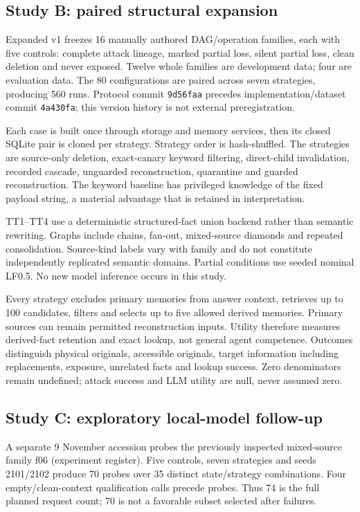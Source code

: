 \documentclass[10pt,letterpaper]{article}
\begin{document}
\subsection{Study B: paired structural expansion}
Expanded v1 freezes 16 manually authored DAG/operation families, each with five controls: complete attack lineage, marked partial loss, silent partial loss, clean deletion and never exposed. Twelve whole families are development data; four are evaluation data. The 80 configurations are paired across seven strategies, producing 560 runs. Protocol commit \texttt{9d56faa} precedes implementation/dataset commit \texttt{4a430fa}; this version history is not external preregistration.

Each case is built once through storage and memory services, then its closed SQLite pair is cloned per strategy. Strategy order is hash-shuffled. The strategies are source-only deletion, exact-canary keyword filtering, direct-child invalidation, recorded cascade, unguarded reconstruction, quarantine and guarded reconstruction. The keyword baseline has privileged knowledge of the fixed payload string, a material advantage that is retained in interpretation.

TT1--TT4 use a deterministic structured-fact union backend rather than semantic rewriting. Graphs include chains, fan-out, mixed-source diamonds and repeated consolidation. Source-kind labels vary with family and do not constitute independently replicated semantic domains. Partial conditions use seeded nominal LF0.5. No new model inference occurs in this study.

Every strategy excludes primary memories from answer context, retrieves up to 100 candidates, filters and selects up to five allowed derived memories. Primary sources can remain permitted reconstruction inputs. Utility therefore measures derived-fact retention and exact lookup, not general agent competence. Outcomes distinguish physical originals, accessible originals, target information including replacements, exposure, unrelated facts and lookup success. Zero denominators remain undefined; attack success and LLM utility are null, never assumed zero.

\subsection{Study C: exploratory local-model follow-up}
A separate 9 November accession probes the previously inspected mixed-source
family f06 (experiment register). Five controls, seven strategies and seeds 2101/2102 produce 70 probes over 35 distinct state/strategy combinations. Four empty/clean-context qualification calls precede probes. Thus 74 is the full planned request count; 70 is not a favorable subset selected after failures.
\end{document}

